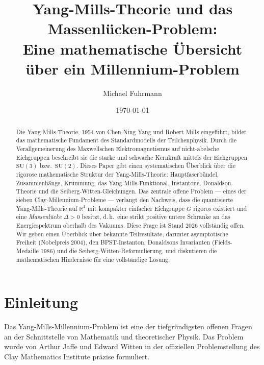 \documentclass[12pt,a4paper]{amsart}
\theoremstyle{definition}
\theoremstyle{remark}
\begin{document}
\title{Yang-Mills-Theorie und das Massenlücken-Problem:\\
Eine mathematische Übersicht über ein Millennium-Problem}

\author{Michael Fuhrmann}
\address{Specialist Mathematics Project, Build 146}
\date{\today}

\begin{abstract}
Die Yang-Mills-Theorie, 1954 von Chen-Ning Yang und Robert Mills eingeführt, bildet das
mathematische Fundament des Standardmodells der Teilchenphysik. Durch die Verallgemeinerung
des Maxwellschen Elektromagnetismus auf nicht-abelsche Eichgruppen beschreibt sie die starke
und schwache Kernkraft mittels der Eichgruppen $\mathrm{SU}(3)$ bzw.\ $\mathrm{SU}(2)$.
Dieses Paper gibt einen systematischen Überblick über die rigorose mathematische Struktur
der Yang-Mills-Theorie: Hauptfaserbündel, Zusammenhänge, Krümmung, das Yang-Mills-Funktional,
Instantone, Donaldson-Theorie und die Seiberg-Witten-Gleichungen. Das zentrale offene
Problem — eines der sieben Clay-Millennium-Probleme — verlangt den Nachweis, dass die
quantisierte Yang-Mills-Theorie auf $\mathbb{R}^4$ mit kompakter einfacher Eichgruppe $G$
rigoros existiert und eine \emph{Massenlücke} $\Delta > 0$ besitzt, d.\,h.\ eine strikt
positive untere Schranke an das Energiespektrum oberhalb des Vakuums. Diese Frage ist
Stand 2026 vollständig offen. Wir geben einen Überblick über bekannte Teilresultate,
darunter asymptotische Freiheit (Nobelpreis 2004), den BPST-Instanton, Donaldsons
Invarianten (Fields-Medaille 1986) und die Seiberg-Witten-Reformulierung, und
diskutieren die mathematischen Hindernisse für eine vollständige Lösung.
\end{abstract}

\maketitle

\tableofcontents

\section{Einleitung}

Das Yang-Mills-Millennium-Problem ist eine der tiefgründigsten offenen Fragen an der
Schnittstelle von Mathematik und theoretischer Physik. Das Problem wurde von Arthur Jaffe
und Edward Witten in der offiziellen Problemstellung des Clay Mathematics Institute
\cite{JaffeWitten2000} präzise formuliert.
\end{document}
